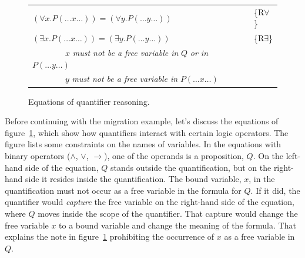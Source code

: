 {{\begin{figure}
\begin{center}
\begin{tabular}{ll}
$(\forall x.P(\dots x \dots)) = (\forall y.P(\dots y \dots))$                                     & \{R$\forall$\} \\
$(\exists x.P(\dots x \dots)) = (\exists y.P(\dots y \dots))$                                     & \{R$\exists$\} \\
~~~~~~~~$x$ \emph{must not be a free variable in} $Q$ \emph{or in} $P(\dots y \dots)$     & \\
~~~~~~~~$y$ \emph{must not be a free variable in} $P(\dots x \dots)$                      & \\
\end{tabular}
\end{center}
\caption{Equations of quantifier reasoning.}
\label{fig-02-quantifiers}
\end{figure}

Before continuing with the migration example,
let's discuss the equations of figure~\ref{fig-02-quantifiers},
which show how quantifiers interact with certain logic operators.
The figure lists some constraints on the names of variables.
In the equations with binary operators ($\wedge$, $\vee$, $\rightarrow$),
one of the operands
is a proposition, $Q$.
On the left-hand side of the equation,
$Q$ stands outside the quantification, but
on the right-hand side it resides inside the quantification.
The bound variable, $x$, in the quantification
must not occur as a free variable in the formula for $Q$.
If it did, the quantifier would
\emph{capture}
the free variable on the right-hand side of the equation,
where $Q$ moves inside the scope of the quantifier.
That capture would change the free variable $x$ to a bound variable
and change the meaning of the formula.
That explains the note in figure~\ref{fig-02-quantifiers} prohibiting the occurrence of $x$ as
a free variable in $Q$.

}}
